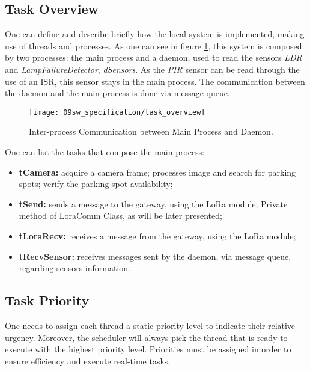 \subsection{Task Overview}
One can define and describe briefly how the local system is implemented, making use of threads and processes. As one can see in figure \ref{fig:task_overview}, this system is composed by two processes: the main process and a daemon, used to read the sensors \textit{LDR} and \textit{LampFailureDetector}, \textit{dSensors}. As the \textit{PIR} sensor can be read through the use of an ISR, this sensor stays in the main process. The communication between the daemon and the main process is done via message queue.

\begin{figure}[H]
	\centering
	\texttt{[image: 09sw\_specification/task\_overview]}
	\caption{Inter-process Communication between Main Process and Daemon.}
	\label{fig:task_overview}
\end{figure}

\clearpage
One can list the tasks that compose the main process:
\begin{itemize}
	\item \textbf{tCamera:} acquire a camera frame; processes image and search for parking spots; verify the parking spot availability;
 	\item \textbf{tSend:} sends a message to the gateway, using the LoRa module; Private method of LoraComm Class, as will be later presented;
	\item \textbf{tLoraRecv:} receives a message from the gateway, using the LoRa module;
	\item \textbf{tRecvSensor:} receives messages sent by the daemon, via message queue, regarding sensors information.
\end{itemize}

\subsection{Task Priority}

One needs to assign each thread a static priority level to indicate their relative urgency. Moreover, the scheduler will always pick the thread that is ready to execute with the highest priority level. Priorities must be assigned in order to ensure efficiency and execute real-time tasks.

